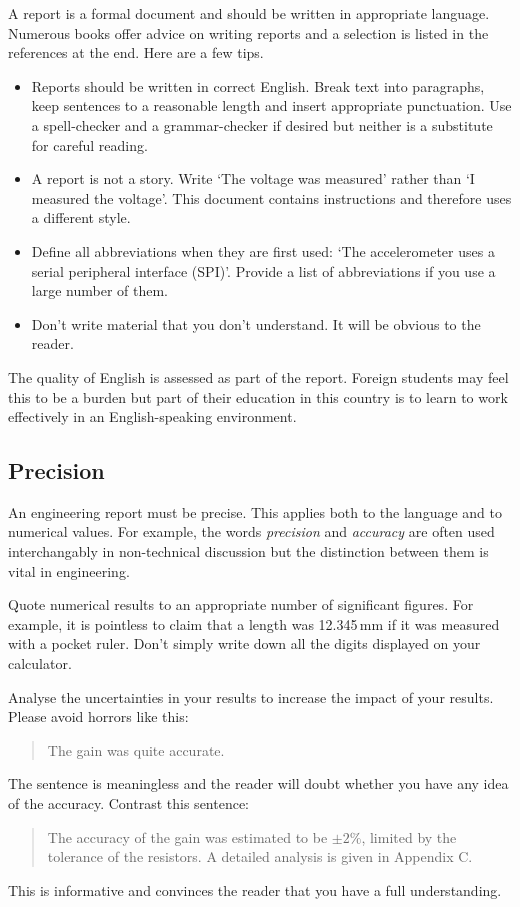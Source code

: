 A report is a formal document and should be written in appropriate language. Numerous books offer advice on writing reports and a selection \cite{jve05,mkm06,dfb09,tmy05} is listed in the references at the end. Here are a few tips.
\begin{itemize}
\item
Reports should be written in correct English. Break text into paragraphs, keep sentences to a reasonable length and insert appropriate punctuation. Use a spell-checker and a grammar-checker if desired but neither is a substitute for careful reading. 
\item
A report is not a story. 
Write `The voltage was measured' rather than `I measured the voltage'. This document contains instructions and therefore uses a different style.
\item
Define all abbreviations when they are first used: `The accelerometer uses a serial peripheral interface (SPI)'. Provide a list of abbreviations if you use a large number of them.
\item
Don't write material that you don't understand. It will be obvious to the reader.
\end{itemize}
The quality of English is assessed as part of the report. Foreign students may feel this to be a burden but part of their education in this country is to learn to work effectively in an English-speaking environment. 

\subsection{Precision}

An engineering report must be precise. This applies both to the language and to numerical values. For example, the words \emph{precision} and \emph{accuracy} are often used interchangably in non-technical discussion but the distinction between them is vital in engineering.

Quote numerical results to an appropriate number of significant figures. For example, it is pointless to claim that a length was 12.345\,mm if it was measured with a pocket ruler. Don't simply write down all the digits displayed on your calculator. 

Analyse the uncertainties in your results to increase the impact of your results. Please avoid horrors like this:
\begin{quote}
The gain was quite accurate.
\end{quote}
The sentence is meaningless and the reader will doubt whether you have any idea of the accuracy. Contrast this sentence:
\begin{quote}
The accuracy of the gain was estimated to be $\pm 2\%$, limited by the tolerance of the resistors. A detailed analysis is given in Appendix C.
\end{quote}
This is informative and convinces the reader that you have a full understanding.

